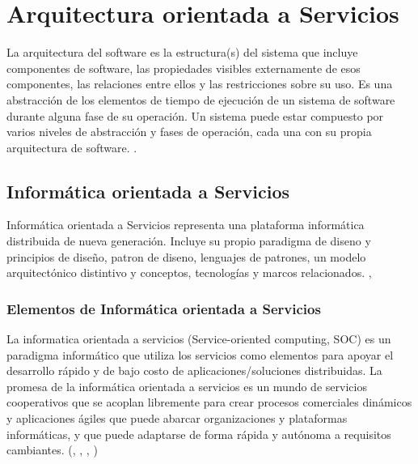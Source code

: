 

\chapter{Arquitectura orientada a Servicios}
\label{ch:SOA}

La arquitectura del software es la estructura(s) del sistema que incluye componentes de software, las propiedades visibles externamente de esos componentes, las relaciones entre ellos y las restricciones sobre su uso.  Es una abstracción de los elementos de tiempo de ejecución de un sistema de software durante alguna fase de su operación. Un sistema puede estar compuesto por varios niveles de abstracción y fases de operación, cada una con su propia arquitectura de software. \cite{Fielding2000}.  


\section{Informática orientada a Servicios}

Informática orientada a Servicios representa una plataforma informática distribuida de nueva generación. 
 Incluye su propio \gls{paradigma de diseno} y principios de diseño,  \gls{patron de diseno}, lenguajes de patrones, un modelo arquitectónico distintivo y conceptos, tecnologías y marcos relacionados.
 \cite{Erl2007a}, \cite{Erl2008}
 
 \subsection{Elementos de Informática orientada a  Servicios}
 
 La \gls{informatica orientada a servicios} (Service-oriented computing, SOC) es un paradigma informático que utiliza los servicios como
 elementos para apoyar el desarrollo rápido y de bajo costo de aplicaciones/soluciones  distribuidas. La promesa de la informática orientada a servicios es un mundo de servicios cooperativos  que se acoplan libremente para crear  procesos comerciales dinámicos y aplicaciones ágiles  que puede abarcar organizaciones y plataformas informáticas, y que puede adaptarse de forma rápida y autónoma  a   requisitos cambiantes. (\cite{Buyya2013}, \cite{DimitriosGeorgakopoulos2009}, \cite{Erl2007}, \cite{Papazoglou2003} )
 

